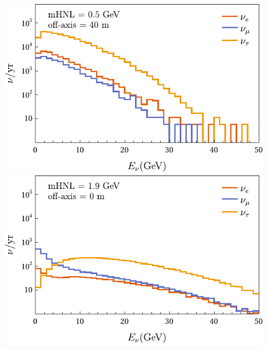 \documentclass[aps,prd,twocolumn,superscriptaddress,amsmath,amssymb]{revtex4}
\newcommand{\lw}{\linewidth}
\begin{document}
\includegraphics[width=\lw]{plots/meeting/e-05-40.pdf}
\includegraphics[width=\lw]{plots/meeting/e-19-0.pdf}




















\end{document}
